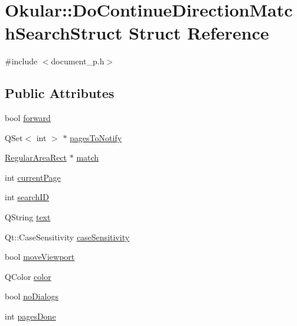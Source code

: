 \hypertarget{structOkular_1_1DoContinueDirectionMatchSearchStruct}{\section{Okular\+:\+:Do\+Continue\+Direction\+Match\+Search\+Struct Struct Reference}
\label{structOkular_1_1DoContinueDirectionMatchSearchStruct}
}


{\ttfamily \#include $<$document\+\_\+p.\+h$>$}

\subsection*{Public Attributes}
\begin{DoxyCompactItemize}
\item 
bool \hyperlink{structOkular_1_1DoContinueDirectionMatchSearchStruct_ac33cf94809ed8498fc706efacd1cc79e}{forward}
\item 
Q\+Set$<$ int $>$ $\ast$ \hyperlink{structOkular_1_1DoContinueDirectionMatchSearchStruct_a27dfab7440a3e4889b39307626a6aa7a}{pages\+To\+Notify}
\item 
\hyperlink{classOkular_1_1RegularAreaRect}{Regular\+Area\+Rect} $\ast$ \hyperlink{structOkular_1_1DoContinueDirectionMatchSearchStruct_a549890917311bf7520a62da5c6bf0861}{match}
\item 
int \hyperlink{structOkular_1_1DoContinueDirectionMatchSearchStruct_a52b83c7586463bfa968075de2d131250}{current\+Page}
\item 
int \hyperlink{structOkular_1_1DoContinueDirectionMatchSearchStruct_a311791184c19130a099f65f84384db6e}{search\+I\+D}
\item 
Q\+String \hyperlink{structOkular_1_1DoContinueDirectionMatchSearchStruct_a69c1b9beb5762d997a0dfeff5c714239}{text}
\item 
Qt\+::\+Case\+Sensitivity \hyperlink{structOkular_1_1DoContinueDirectionMatchSearchStruct_afe83f59649cbdbac5029e6f37c6840f5}{case\+Sensitivity}
\item 
bool \hyperlink{structOkular_1_1DoContinueDirectionMatchSearchStruct_a071c07e92481fedb9f382ae2e8935be9}{move\+Viewport}
\item 
Q\+Color \hyperlink{structOkular_1_1DoContinueDirectionMatchSearchStruct_ae80b5fde810c935ec5436acc3821a485}{color}
\item 
bool \hyperlink{structOkular_1_1DoContinueDirectionMatchSearchStruct_a3092dffdbf938354e545665e1d6b575d}{no\+Dialogs}
\item 
int \hyperlink{structOkular_1_1DoContinueDirectionMatchSearchStruct_a0fe5f9b4cf4ef21a355f87a180fae56f}{pages\+Done}
\end{DoxyCompactItemize}


